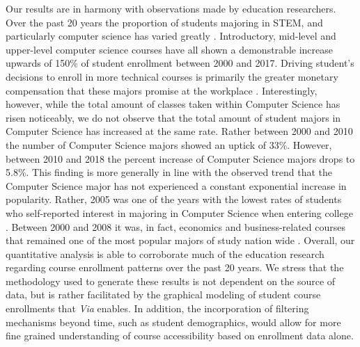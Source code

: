Our results are in harmony with observations made by education researchers. Over the past 20 years the proportion of students majoring in STEM, and particularly computer science has varied greatly \cite{ComputingResearchAssociation2017}. Introductory, mid-level and upper-level computer science courses have all shown a demonstrable increase upwards of 150\% of student enrollment between 2000 and 2017. Driving student's decisions to enroll in more technical courses is primarily the greater monetary compensation that these majors promise at the workplace \cite{Downey2007}. Interestingly, however, while the total amount of classes taken within Computer Science has risen noticeably, we do not observe that the total amount of student majors in Computer Science has increased at the same rate. Rather between 2000 and 2010 the number of Computer Science majors showed an uptick of 33\%. However, between 2010 and 2018 the percent increase of Computer Science majors drops to 5.8\%. This finding is more generally in line with the observed trend that the Computer Science major has not experienced a constant exponential increase in popularity. Rather, 2005 was one of the years with the lowest rates of students who self-reported interest in majoring in Computer Science when entering college \cite{Patterson2005}. Between 2000 and 2008 it was, in fact, economics and business-related courses that remained one of the most popular majors of study nation wide \cite{NationalCenterforEducation2018}. Overall, our quantitative analysis is able to corroborate much of the education research regarding course enrollment patterns over the past 20 years. We stress that the methodology used to generate these results is not dependent on the source of data, but is rather facilitated by the graphical modeling of student course enrollments that \textit{Via} enables. In addition, the incorporation of filtering mechanisms beyond time, such as student demographics, would allow for more fine grained understanding of course accessibility based on enrollment data alone.
